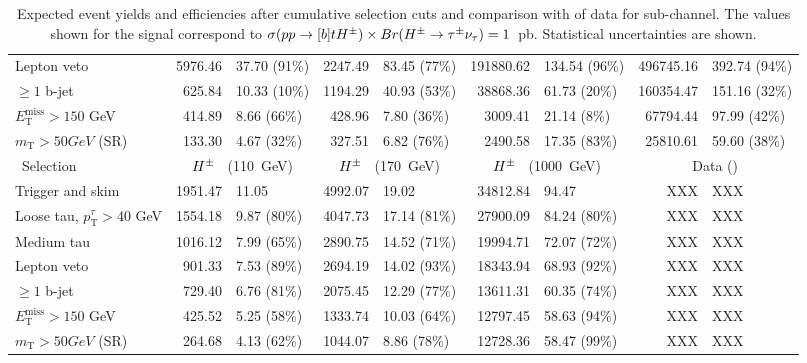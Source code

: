 \begin{table}[!thp]
\begin{center}
{\begin{tabular}{|l|r@{ $\pm$ }l|r@{ $\pm$ }l|r@{ $\pm$ }l|r@{ $\pm$ }l|}
			Lepton veto  & 5976.46 & 37.70 (91\%) & 2247.49 & 83.45 (77\%) & 191880.62 & 134.54 (96\%) & 496745.16 & 392.74 (94\%) \\
			$\ge 1$ b-jet                    & 625.84 & 10.33 (10\%) & 1194.29 & 40.93 (53\%) & 38868.36 & 61.73 (20\%) & 160354.47 & 151.16 (32\%) \\
			$E_\mathrm{T}^\mathrm{miss}>150$ GeV\       & 414.89 & 8.66 (66\%) & 428.96 & 7.80 (36\%) & 3009.41 & 21.14 (8\%) & 67794.44 & 97.99 (42\%) \\
			$m_\mathrm{T}>50 GeV$ (SR)                          & 133.30 & 4.67 (32\%) & 327.51 & 6.82 (76\%) & 2490.58 & 17.35 (83\%) & 25810.61 &59.60 (38\%) \\
			\hline\
			Selection                                        & \multicolumn{2}{c|}{$H^{\pm}$ $\phantom{0}$(110~GeV)} & \multicolumn{2}{c|}{$H^{\pm}$ $\phantom{0}$(170~GeV)} & \multicolumn{2}{c|}{$H^{\pm}$ $\phantom{0}$(1000~GeV)} & \multicolumn{2}{c|}{Data (\LUMI )}  \\ 
			\hline
			Trigger and skim                            & 1951.47 & 11.05 & 4992.07 & 19.02 & 34812.84 & 94.47 & XXX & XXX \\
			Loose tau, $p_\mathrm{T}^{\tau}>40$ GeV   & 1554.18 & 9.87 (80\%) & 4047.73 & 17.14 (81\%) & 27900.09 & 84.24 (80\%) & XXX & XXX\\
			Medium tau             & 1016.12 & 7.99 (65\%) & 2890.75 & 14.52 (71\%) & 19994.71 & 72.07 (72\%) & XXX  & XXX\\
			Lepton veto  & 901.33 & 7.53 (89\%) & 2694.19 & 14.02 (93\%) & 18343.94 & 68.93 (92\%) & XXX & XXX\\
			$\ge 1$ b-jet                    & 729.40 & 6.76 (81\%) & 2075.45 & 12.29 (77\%) & 13611.31 & 60.35 (74\%) & XXX & XXX \\
			$E_\mathrm{T}^\mathrm{miss}>150$ GeV\       & 425.52 & 5.25 (58\%) & 1333.74 & 10.03 (64\%) & 12797.45 & 58.63 (94\%) & XXX & XXX \\
			$m_\mathrm{T}>50 GeV$ (SR)                          & 264.68 & 4.13 (62\%) & 1044.07 & 8.86 (78\%) & 12728.36 & 58.47 (99\%) & XXX & XXX \\
			\hline
			\end{tabular}}
			 \caption{\label{tab:expected_yields_taujets}
			     Expected event yields and efficiencies after cumulative selection cuts and comparison with \LUMI of 
			     data for \taujets sub-channel.
			     The values shown for the signal correspond to $\sigma(pp \to [b]tH^{\pm}) \times Br(H^{\pm} \to \tau^{\pm} \nu_{\tau})=1$~pb.
			     Statistical uncertainties are shown.}
			 \end{center}
	   \end{table}

